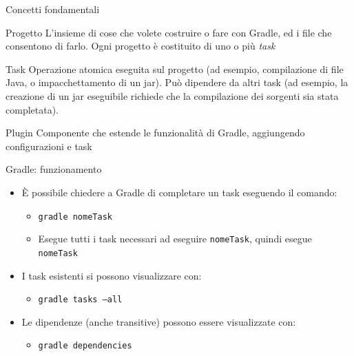 \documentclass[presentation]{beamer}
\begin{document}
\begin{frame}[allowframebreaks]{Concetti fondamentali}
    \begin{block}{Progetto}
        L'insieme di cose che volete costruire o fare con Gradle, ed i file che consentono di farlo. Ogni progetto è costituito di uno o più \textit{task}
    \end{block}
    \begin{block}{Task}
        Operazione atomica eseguita sul progetto (ad esempio, compilazione di file Java, o impacchettamento di un jar). Può dipendere da altri task (ad esempio, la creazione di un jar eseguibile richiede che la compilazione dei sorgenti sia stata completata).
    \end{block}
    \begin{block}{Plugin}
        Componente che estende le funzionalità di Gradle, aggiungendo configurazioni e task
    \end{block}
\end{frame}

\begin{frame}{Gradle: funzionamento}
    \begin{itemize}
        \item È possibile chiedere a Gradle di completare un task eseguendo il comando:
        \begin{itemize}
            \item \texttt{gradle nomeTask}
            \item Esegue tutti i task necessari ad eseguire \texttt{nomeTask}, quindi esegue \texttt{nomeTask}
        \end{itemize}
        \item I task esistenti si possono visualizzare con:
        \begin{itemize}
            \item \texttt{gradle tasks --all}
        \end{itemize}
        \item Le dipendenze (anche transitive) possono essere visualizzate con:
        \begin{itemize}
            \item \texttt{gradle dependencies}
        \end{itemize}
    \end{itemize}
\end{frame}
\end{document}
